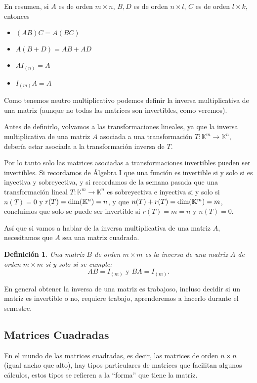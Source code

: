 \documentclass[12pt]{book}
\newtheorem{defi}{Definici\'on}
\def\K{\mathbb{K}}
\def\dim{\textup{dim}}
\begin{document}
 

En resumen, si $A$ es de orden $m\times n$, $B, D$ es de orden $n\times l$, $C$ es de orden $l\times k$, entonces

\begin{multicols}{2}
\begin{itemize}
\item $(AB)C=A(BC)$
\item $A(B+D)=AB+AD$
\item $AI_{(n)}=A$
\item $I_{(m)}A=A$
\end{itemize}
\end{multicols}

Como tenemos neutro multiplicativo podemos definir la inversa multiplicativa de una matriz (aunque no todas las matrices son invertibles, como veremos).

Antes de definirlo, volvamos a las transformaciones lineales, ya que la inversa multiplicativa de una matriz $A$ asociada a una transformación $T:\K^m\rightarrow\K^n$, debería estar asociada a la transformación inversa de $T$.

Por lo tanto solo las matrices asociadas a transformaciones invertibles pueden ser invertibles.
Si recordamos de Álgebra I que una función es invertible si y solo si es inyectiva y sobreyectiva, y si recordamos de la semana pasada que una transformación lineal $T:\K^m\rightarrow\K^n$ es sobreyectiva e inyectiva si y solo si $n(T)=0$ y $r(T)=\dim(\K^n)=n$, y que $n(T)+r(T)=\dim(\K^m)=m$, concluimos que solo se puede ser invertible si $r(T)=m=n$ y $n(T)=0$.

Así que si vamos a hablar de la inversa multiplicativa de una matriz $A$, necesitamos que $A$ sea una matriz cuadrada.

\begin{defi}
  Una matriz $B$ de orden $m\times m$ es la inversa de una matriz $A$ de orden $m\times m$ si y solo si se cumple:
$$AB=I_{(m)}\textrm{ y } BA=I_{(m)}.$$
\end{defi}


En general obtener la inversa de una matriz es trabajoso, incluso decidir si un matriz es invertible o no, requiere trabajo, aprenderemos a hacerlo durante el semestre.


\subsection{Matrices Cuadradas}

En el mundo de las matrices cuadradas, es decir, las matrices de orden $n\times n$ (igual ancho que alto), hay tipos particulares de matrices que facilitan algunos cálculos, estos tipos se refieren a la ``forma'' que tiene la matriz.
\end{document}

